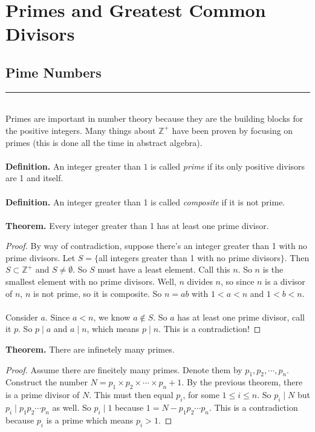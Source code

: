 \documentclass[class=article, crop=false]{standalone}
\def\integers{{\mathbb Z}}
\begin{document}
    
\section{Primes and Greatest Common Divisors}

\subsection{Pime Numbers}
\rule{\textwidth}{1pt}\\
Primes are important in number theory because they are the building blocks for the positive integers.
Many things about $\integers^+$ have been proven by focusing on primes (this is done all the time in abstract algebra).\\\\
\textbf{Definition.} An integer greater than $1$ is called \emph{prime} if its only positive divisors are 
1 and itself.\\\\
\textbf{Definition.} An integer greater than 1 is called \emph{composite} if it is not prime.\\\\
\textbf{Theorem.} Every integer greater than 1 has at least one prime divisor.
\begin{proof}
	By way of contradiction, suppose there's an integer greater than 1 with no prime divisors.
	Let $S=\{$all integers greater than 1 with no prime divisors$\}$.
	Then $S\subset\integers^+$ and $S\neq\emptyset$. So $S$ must have a least element. Call this $n$.
	So $n$ is the smallest element with no prime divisors. Well, $n$ divides $n$, so since $n$ is a divisor
	of $n$, $n$ is not prime, so it is composite. So $n=ab$ with $1<a<n$ and $1<b<n$.\\\\
	Consider $a$. Since $a<n$, we know $a\notin S$. So $a$ has at least one prime divisor, call it $p$.
	So $p\mid a$ and $a\mid n$, which means $p\mid n$. This is a contradiction!
\end{proof}
\noindent\textbf{Theorem.} There are infinetely many primes.
\begin{proof}
	Assume there are fineitely many primes. Denote them by $p_1, p_2, \cdots, p_n$. Construct the number
	$N=p_1\times p_2\times \cdots \times p_n + 1$. By the previous theorem, there is a prime divisor of $N$.
	This must then equal $p_i$, for some $1\leq i\leq n$. So $p_i \mid N$ but $p_i\mid p_1 p_2\cdots p_n$ as well.
	So $p_i\mid 1$ because $1=N-p_1p_2\cdots p_n$. This is a contradiction because $p_i$ is a prime which means $p_i >1$.
\end{proof}
\end{document}
